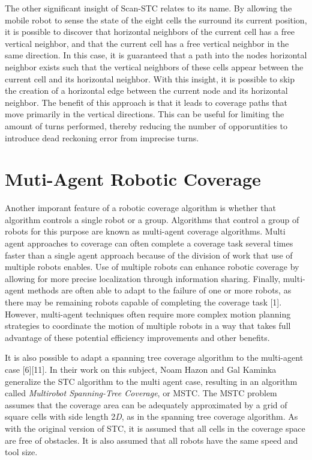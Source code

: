 
The other significant insight of Scan-STC relates to its name. By allowing the mobile robot to sense the state of the eight cells the surround its current position, it is possible to discover that horizontal neighbors of the current cell has a free vertical neighbor, and that the current cell has a free vertical neighbor in the same direction. In this case, it is guaranteed that a path into the nodes horizontal neighbor exists such that the vertical neighbors of these cells appear between the current cell and its horizontal neighbor. With this insight, it is possible to skip the creation of a horizontal edge between the current node and its horizontal neighbor. The benefit of this approach is that it leads to coverage paths that move primarily in the vertical directions. This can be useful for limiting the amount of turns performed, thereby reducing the number of opporuntities to introduce dead reckoning error from imprecise turns.

\section{Muti-Agent Robotic Coverage}

Another imporant feature of a robotic coverage algorithm is whether that algorithm controls a single robot or a group. Algorithms that control a group of robots for this purpose are known as multi-agent coverage algorithms. Multi agent approaches to coverage can often complete a coverage task several times faster than a single agent approach because of the division of work that use of multiple robots enables. Use of multiple robots can enhance robotic coverage by allowing for more precise localization through information sharing. Finally, multi-agent methods are often able to adapt to the failure of one or more robots, as there may be remaining robots capable of completing the coverage task [1]. However, multi-agent techniques often require more complex motion planning strategies to coordinate the motion of multiple robots in a way that takes full advantage of these potential efficiency improvements and other benefits.

It is also possible to adapt a spanning tree coverage algorithm to the multi-agent case [6][11]. In their work on this subject, Noam Hazon and Gal Kaminka generalize the STC algorithm to the multi agent case, resulting in an algorithm called \textit{Multirobot Spanning-Tree Coverage}, or MSTC. The MSTC problem assumes that the coverage area can be adequately approximated by a grid of square cells with side length 2\textit{D}, as in the spanning tree coverage algorithm. As with the original version of STC, it is assumed that all cells in the coverage space are free of obstacles. It is also assumed that all robots have the same speed and tool size.

